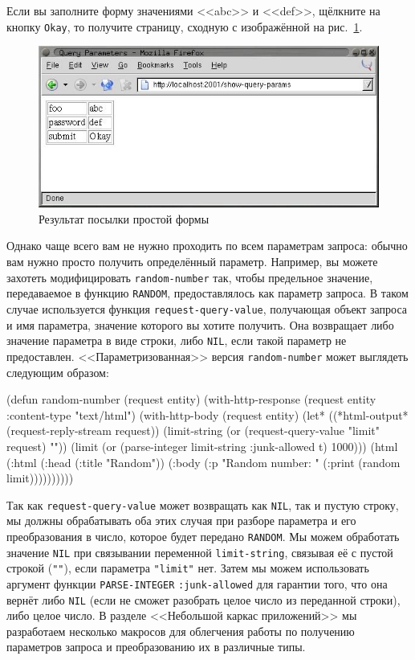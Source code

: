 Если вы заполните форму значениями <<abc>> и <<def>>, щёлкните на кнопку \texttt{Okay}, то
получите страницу, сходную с изображённой на рис.~\ref{fig:26-6}.

\begin{figure}[htb]
  \centering
  \includegraphics[scale=0.7]{images/show-query-params-2.jpg}
  \caption{Результат посылки простой формы}
  \label{fig:26-6}
\end{figure}

Однако чаще всего вам не нужно проходить по всем параметрам запроса: обычно вам нужно
просто получить определённый параметр. Например, вы можете захотеть модифицировать
\lstinline{random-number} так, чтобы предельное значение, передаваемое в функцию
\lstinline{RANDOM}, предоставлялось как параметр запроса. В таком случае используется функция
\lstinline{request-query-value}, получающая объект запроса и имя параметра, значение которого
вы хотите получить. Она возвращает либо значение параметра в виде строки, либо
\lstinline{NIL}, если такой параметр не предоставлен. <<Параметризованная>> версия
\lstinline{random-number} может выглядеть следующим образом:

\begin{myverb}
(defun random-number (request entity)
  (with-http-response (request entity :content-type "text/html")
    (with-http-body (request entity)
      (let* ((*html-output* (request-reply-stream request))
             (limit-string (or (request-query-value "limit" request) ""))
             (limit (or (parse-integer limit-string :junk-allowed t) 1000)))
        (html
          (:html
            (:head (:title "Random"))
            (:body
              (:p "Random number: " (:print (random limit))))))))))
\end{myverb}

Так как \lstinline{request-query-value} может возвращать как \lstinline{NIL}, так и пустую
строку, мы должны обрабатывать оба этих случая при разборе параметра и его преобразования
в число, которое будет передано \lstinline{RANDOM}. Мы можем обработать значение
\lstinline{NIL} при связывании переменной \lstinline{limit-string}, связывая её с
пустой строкой (\lstinline{""}), если параметра \lstinline{"limit"} нет. Затем мы можем использовать
аргумент функции \lstinline{PARSE-INTEGER} \lstinline{:junk-allowed} для гарантии того,
что она вернёт либо \lstinline{NIL} (если не сможет разобрать целое число из переданной
строки), либо целое число. В разделе <<Небольшой каркас приложений>> мы разработаем
несколько макросов для облегчения работы по получению параметров запроса и преобразованию
их в различные типы.

